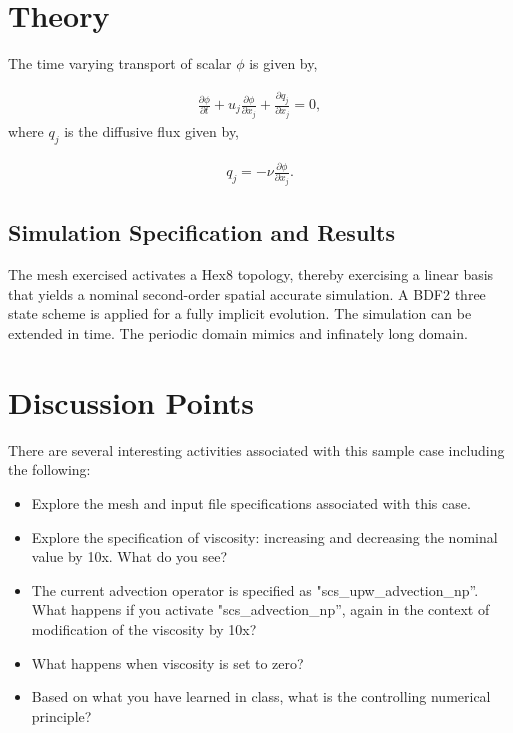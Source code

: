 \documentclass{article}
\begin{document}
\section{Theory}
The time varying transport of scalar $\phi$ is given by,

\begin{align}
  \frac {\partial \phi }{\partial t} + u_j \frac{ \partial \phi }{\partial x_j} + \frac{\partial q_j}{\partial x_j} = 0,
\label{eq:contEq}
\end{align} 
where $q_j$ is the diffusive flux given by,

\begin{align}
  q_j = -\nu \frac{\partial \phi}{\partial x_j}.
\label{eq:momEq}
\end{align}

\subsection{Simulation Specification and Results}

The mesh exercised activates a Hex8 topology, thereby exercising a
linear basis that yields a nominal second-order spatial accurate
simulation. A BDF2 three state scheme is applied for a fully implicit
evolution. The simulation can be extended in time. The periodic domain
mimics and infinately long domain.

\section{Discussion Points}

There are several interesting activities associated with this sample case including
the following:

\begin{itemize}
	\item Explore the mesh and input file specifications associated with this case.
	\item Explore the specification of viscosity: increasing and decreasing the nominal value by 10x. 
          What do you see?
        \item The current advection operator is specified as "scs\_upw\_advection\_np''. What happens if you
          activate "scs\_advection\_np'', again in the context of modification of the viscosity by 10x?
        \item What happens when viscosity is set to zero?
        \item Based on what you have learned in class, what is the controlling numerical principle?
\end{itemize}
\end{document}

